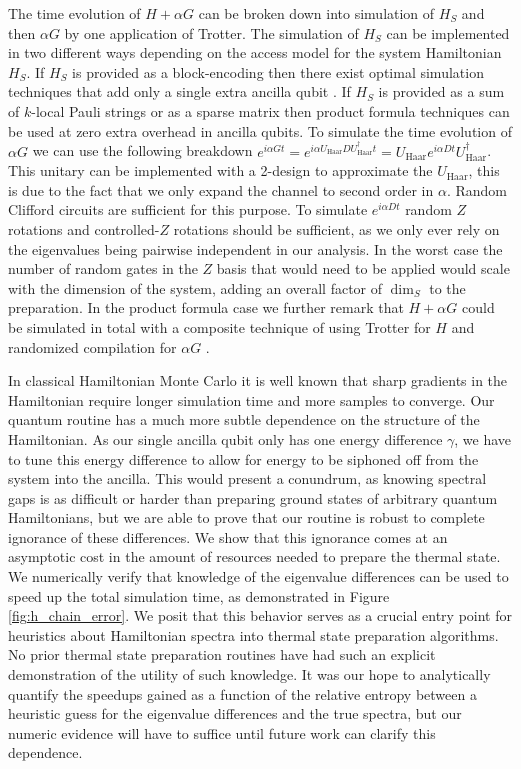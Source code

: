 \documentclass[
 amsmath,amssymb,
 aps,
onecolumn, 
nofootinbib]{revtex4-2}
\newcommand{\haar}{\text{Haar}}
\begin{document}
The time evolution of $H + \alpha G$ can be broken down into simulation of $H_S$ and then $\alpha G$ by one application of Trotter. The simulation of $H_S$ can be implemented in two different ways depending on the access model for the system Hamiltonian $H_S$. If $H_S$ is provided as a block-encoding then there exist optimal simulation techniques that add only a single extra ancilla qubit \cite{low2019hamiltonian}. If $H_S$ is provided as a sum of $k$-local Pauli strings or as a sparse matrix then product formula techniques can be used \cite{childs2021theory} at zero extra overhead in ancilla qubits. To simulate the time evolution of $\alpha G$ we can use the following breakdown $e^{i \alpha G t} = e^{i \alpha U_{\haar} D U_{\haar}^\dagger t} = U_{\haar} e^{i \alpha  D  t}U_{\haar}^\dagger$. This unitary can be implemented with a 2-design to approximate the $U_{\haar}$, this is due to the fact that we only expand the channel to second order in $\alpha$. Random Clifford circuits \cite{webb2015clifford} are sufficient for this purpose. To simulate $e^{i \alpha D t}$ random $Z$ rotations and controlled-$Z$ rotations should be sufficient, as we only ever rely on the eigenvalues being pairwise independent in our analysis. In the worst case the number of random gates in the $Z$ basis that would need to be applied would scale with the dimension of the system, adding an overall factor of $\dim_S$ to the preparation. In the product formula case we further remark that $H + \alpha G$ could be simulated in total with a composite technique of using Trotter for $H$ and randomized compilation for $\alpha G$ \cite{hagan2023composite}. 

In classical Hamiltonian Monte Carlo it is well known that sharp gradients in the Hamiltonian require longer simulation time and more samples to converge. Our quantum routine has a much more subtle dependence on the structure of the Hamiltonian. As our single ancilla qubit only has one energy difference $\gamma$, we have to tune this energy difference to allow for energy to be siphoned off from the system into the ancilla. This would present a conundrum, as knowing spectral gaps is as difficult or harder than preparing ground states of arbitrary quantum Hamiltonians, but we are able to prove that our routine is robust to complete ignorance of these differences. We show that this ignorance comes at an asymptotic cost in the amount of resources needed to prepare the thermal state. We numerically verify that knowledge of the eigenvalue differences can be used to speed up the total simulation time, as demonstrated in Figure \ref{fig:h_chain_error}. We posit that this behavior serves as a crucial entry point for heuristics about Hamiltonian spectra into thermal state preparation algorithms. No prior thermal state preparation routines have had such an explicit demonstration of the utility of such knowledge. It was our hope to analytically quantify the speedups gained as a function of the relative entropy between a heuristic guess for the eigenvalue differences and the true spectra, but our numeric evidence will have to suffice until future work can clarify this dependence.
\end{document}
